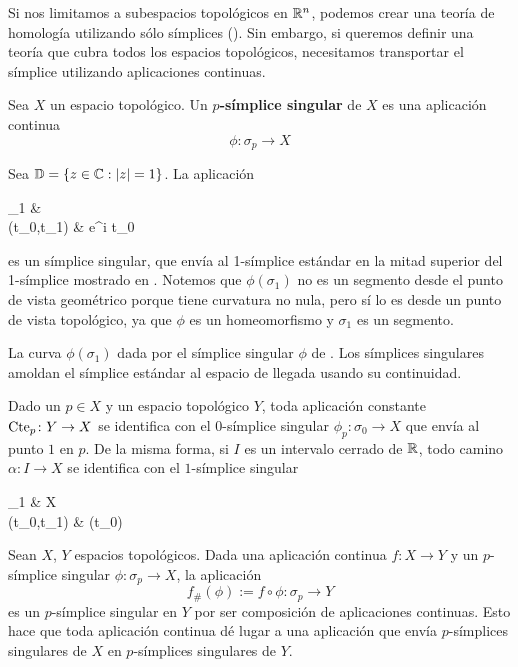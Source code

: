Si nos limitamos a subespacios topológicos en $\mathbb{R}^n$, podemos crear una teoría de homología utilizando sólo símplices ().
Sin embargo, si queremos definir una teoría que cubra todos los espacios topológicos, necesitamos transportar el símplice utilizando aplicaciones continuas.

\begin{definition}
Sea $X$ un espacio topológico.
Un \textbf{$p$-símplice singular} de $X$ es una aplicación continua
	\[\phi\colon \sigma_p \to X\]
\end{definition}

\begin{example}
Sea $\mathbb{D}=\{z \in \mathbb{C}: |z|=1\}$.
La aplicación
\begin{funcion}
	\phi\colon \sigma_1 \arrow[r]	& \\
	(t_0,t_1) \arrow[maps to,r] 	& e^{\pi i t_0}
\end{funcion}
es un símplice singular, que envía al 1-símplice estándar en la mitad superior del 1-símplice mostrado en .
Notemos que $\phi(\sigma_1)$ no es un segmento desde el punto de vista geométrico porque tiene curvatura no nula, pero sí lo es desde un punto de vista topológico, ya que $\phi$ es un homeomorfismo y $\sigma_1$ es un segmento.
\end{example}

\begin{marginfigure}
	
	\caption[Circunferencia]{La curva $\phi(\sigma_1)$ dada por el símplice singular $\phi$ de .
	Los símplices singulares amoldan el símplice estándar al espacio de llegada usando su continuidad.}
\end{marginfigure}

Dado un $p \in X$ y un espacio topológico $Y$, toda aplicación constante $\operatorname{Cte}_p\colon Y \to X$ se identifica con el $0$-símplice singular $\phi_p\colon \sigma_0 \to X$ que envía al punto $1$ en $p$.
De la misma forma, si $I$ es un intervalo cerrado de $\mathbb{R}$, todo camino $\alpha\colon I \to X$ se identifica con el $1$-símplice singular
\begin{funcion}
\psi\colon	\sigma_1 \arrow[r]             & X            \\
		{(t_0,t_1)} \arrow[r, maps to] & \alpha(t_0)
\end{funcion}

Sean $X$, $Y$ espacios topológicos.
Dada una aplicación continua $f\colon X \to Y$ y un $p$-símplice singular $\phi\colon \sigma_p \to X$, la aplicación
	\[f_\#(\phi):=f\circ \phi\colon \sigma_p \to Y\]
es un $p$-símplice singular en $Y$ por ser composición de aplicaciones continuas.
Esto hace que toda aplicación continua dé lugar a una aplicación que envía $p$-símplices singulares de $X$ en $p$-símplices singulares de $Y$.

